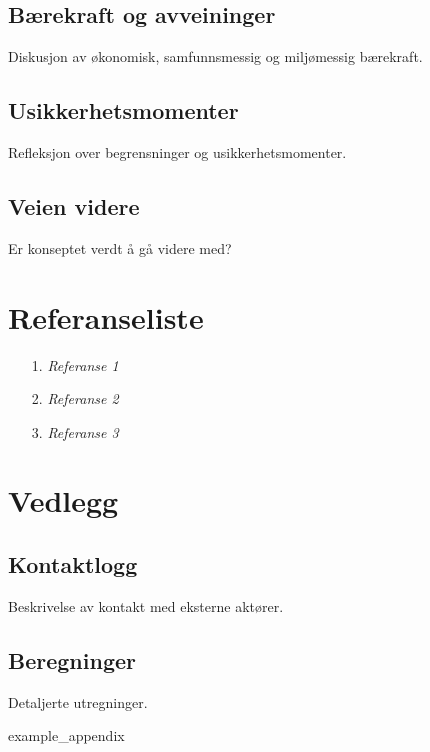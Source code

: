 \documentclass{article}
\begin{document}
\subsection*{Bærekraft og avveininger}
Diskusjon av økonomisk, samfunnsmessig og miljømessig bærekraft.

\subsection*{Usikkerhetsmomenter}
Refleksjon over begrensninger og usikkerhetsmomenter.

\subsection*{Veien videre}
Er konseptet verdt å gå videre med?

\section{Referanseliste}
\begin{itemize}
    \item [1.] \emph{Referanse 1}
    \item [2.] \emph{Referanse 2}
    \item [3.] \emph{Referanse 3}
\end{itemize}

\section{Vedlegg}
\subsection*{Kontaktlogg}
Beskrivelse av kontakt med eksterne aktører.

\subsection*{Beregninger}
Detaljerte utregninger.


\addappendix
{example_appendix}



\end{document}

